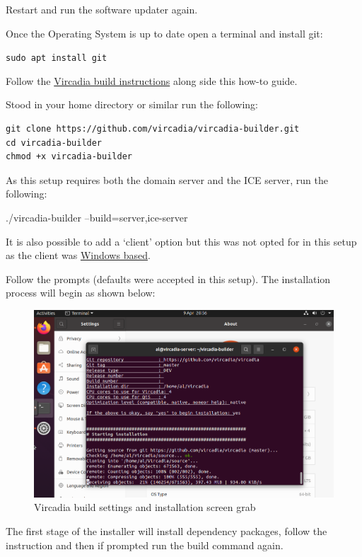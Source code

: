 Restart and run the software updater again.

Once the Operating System is up to date open a terminal and install git:

\texttt{sudo\ apt\ install\ git}

Follow the \href{https://github.com/vircadia/vircadia-builder}{Vircadia
build instructions} along side this how-to guide.

Stood in your home directory or similar run the following:

\begin{verbatim}
git clone https://github.com/vircadia/vircadia-builder.git
cd vircadia-builder
chmod +x vircadia-builder
\end{verbatim}

As this setup requires both the domain server and the ICE server, run
the following:

./vircadia-builder --build=server,ice-server

It is also possible to add a `client' option but this was not opted for
in this setup as the client was
\protect\hyperlink{Client-interface}{Windows based}.

Follow the prompts (defaults were accepted in this setup). The
installation process will begin as shown below:

\begin{figure}
\centering
\includegraphics{UbuntuDesktop20_04VircadiaBuildSettings.png}
\caption{Vircadia build settings and installation screen grab}
\end{figure}

The first stage of the installer will install dependency packages,
follow the instruction and then if prompted run the build command again.


